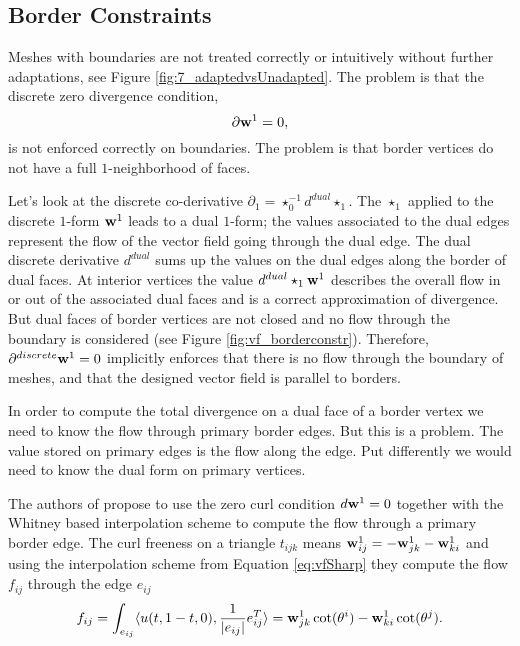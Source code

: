 \subsection{Border Constraints}


Meshes with boundaries are not treated correctly or intuitively without further adaptations, see Figure \ref{fig:7_adaptedvsUnadapted}. The problem is that the discrete zero divergence condition,
\[\partial \textbf{w}^1 = 0,\]
is not enforced correctly on boundaries. The problem is that border vertices do not have a full $1$-neighborhood of faces. 

Let's look at the discrete co-derivative $\partial_1 = \star^{-1}_0 d^{dual} \star_1$. The $\star_1$ applied to the discrete $1$-form $\textbf{w}^1$ leads to a dual $1$-form; the values associated to the dual edges represent the flow of the vector field going through the dual edge. The dual discrete derivative $d^{dual}$ sums up the values on the dual edges along the border of dual faces. At interior vertices the value $d^{dual} \star_1 \textbf{w}^1$ describes the overall flow in or out of the associated dual faces and is a correct approximation of divergence. But dual faces of border vertices are not closed and no flow through the boundary is considered (see Figure \ref{fig:vf_borderconstr}). Therefore, $\partial^{discrete} \textbf{w}^1 = 0$ implicitly enforces that there is no flow through the boundary of meshes, and that the designed vector field is parallel to borders.

In order to compute the total divergence on a dual face of a border vertex we need to know the flow through primary border edges. But this is a problem. The value stored on primary edges is the flow along the edge. Put differently we would need to know the dual form on primary vertices. %

The authors of \cite{vField} propose to use the zero curl condition $d\textbf{w}^1 = 0$ together with the Whitney based interpolation scheme to compute the flow through a primary border edge. The curl freeness on a triangle $t_{ijk}$ means $\textbf{w}^1_{ij} = - \textbf{w}^1_{jk} - \textbf{w}^1_{ki}$ and using the interpolation scheme from Equation \ref{eq:vfSharp} they compute the flow $f_{ij}$ through the edge $e_{ij}$
\begin{equation}f_{ij} = \int_{e_{ij}}\langle u(t, 1-t, 0), \frac{1}{\left| e_{ij} \right|}e_{ij}^{T}\rangle = \textbf{w}^1_{jk} \cot(\theta^i) - \textbf{w}^1_{ki} \cot(\theta^j)\label{eq:vfFluxBorder}.\end{equation}



